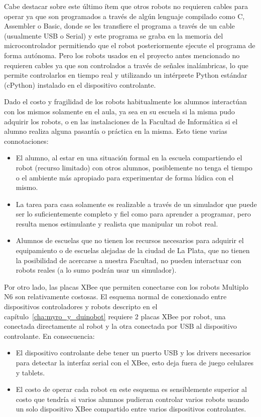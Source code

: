 Cabe destacar sobre este último ítem que otros robots no requieren
cables para operar ya que son programados
a través de algún lenguaje compilado como C, Assembler
o Basic, donde se les transfiere el programa a través de un
cable (usualmente USB o Serial)
y este programa se graba en la memoria del microcontrolador permitiendo
que el robot posteriormente ejecute el programa de forma autónoma.
Pero los robots usados en el proyecto antes mencionado no requieren
cables ya que son controlados a través de señales
inalámbricas, lo que permite controlarlos en tiempo real y utilizando
un intérprete Python estándar (cPython) instalado en el dispositivo
controlante.

Dado el costo y fragilidad de los robots habitualmente los alumnos interactúan
con los mismos solamente en el aula, ya sea en su escuela si la misma pudo
adquirir los robots, o en las instalaciones de la  Facultad de Informática si el alumno
realiza alguna pasantía o práctica en la misma. Esto tiene varias connotaciones:
\begin{itemize}
    \item El alumno, al estar en una situación formal en la escuela
        compartiendo el robot (recurso limitado) con otros
        alumnos, posiblemente no tenga el tiempo o el ambiente más apropiado
        para experimentar de forma lúdica con el mismo.
    \item La tarea para casa solamente es realizable a través de un simulador
        que puede ser lo suficientemente completo y fiel como para aprender
        a programar, pero resulta menos estimulante y realista que manipular
        un robot real.
    \item Alumnos de escuelas que no tienen los recursos necesarios para
        adquirir el equipamiento o de escuelas alejadas de
        la ciudad de La Plata, que
        no tienen la posibilidad de acercarse a nuestra
        Facultad, no pueden interactuar con robots reales
        (a lo sumo podrán usar un simulador).
\end{itemize}

Por otro lado, las placas
XBee que permiten conectarse con los robots Multiplo N6
son relativamente costosas. El esquema normal de conexionado entre dispositivos
controladores y robots descripto en el capítulo~\ref{cha:myro_y_duinobot}
requiere
2 placas XBee por robot, una conectada directamente al robot y la otra
conectada por USB al dispositivo controlante. En consecuencia:
\begin{itemize}
    \item El dispositivo controlante debe tener un puerto USB y los drivers
        necesarios para detectar la interfaz serial con el XBee, esto deja
        fuera de juego celulares y tablets.
    \item El costo de operar cada robot en este esquema es sensiblemente
        superior al costo que tendría si varios alumnos pudieran
        controlar varios robots usando un solo dispositivo XBee compartido
        entre varios dispositivos controlantes.
\end{itemize}

